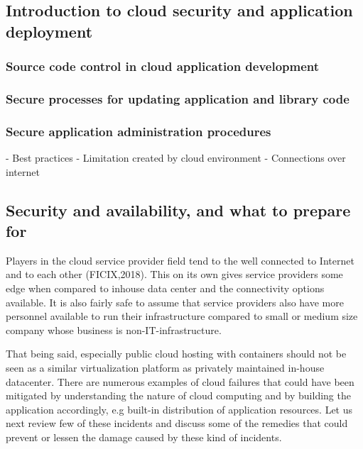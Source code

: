 \documentclass{article}
\begin{document}
\subsection{Introduction to cloud security and application deployment}
\subsubsection{Source code control in cloud application development}
\subsubsection{Secure processes for updating application and library code}
\subsubsection{Secure application administration procedures}
- Best practices
- Limitation created by cloud environment
- Connections over internet
\subsection{Security and availability, and what to prepare for}
Players in the cloud service provider field tend to the well connected to Internet and to each other (FICIX,2018). This on its own gives service providers some edge when compared to inhouse data center and the connectivity options available. It is also fairly safe to assume that service providers also have more personnel available to run their infrastructure compared to small or medium size company whose business is non-IT-infrastructure.
\par
That being said, especially public cloud hosting with containers should not be seen as a similar virtualization platform as privately maintained in-house datacenter. There are numerous examples of cloud failures that could have been mitigated by understanding the nature of cloud computing and by building the application accordingly, e.g built-in distribution of application resources. Let us next review few of these incidents and discuss some of the remedies that could prevent or lessen the damage caused by these kind of incidents.
\end{document}
